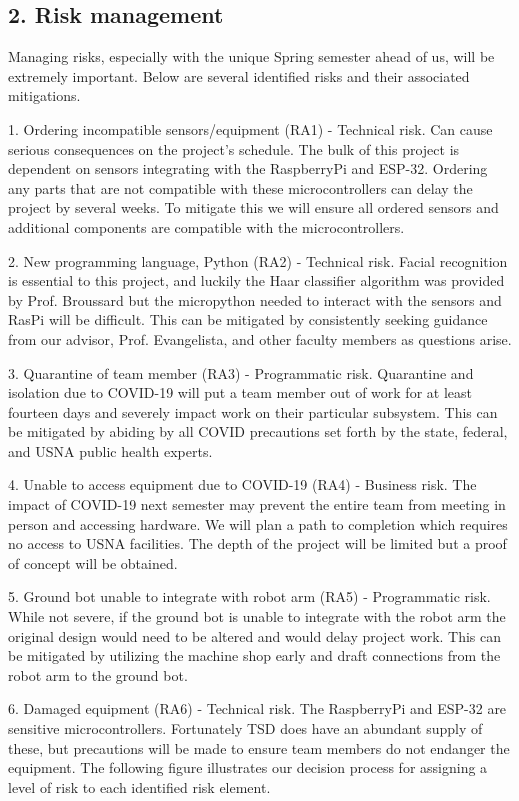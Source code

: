 ﻿\documentclass[10pt]{article}
\begin{document}
\subsection{2. Risk management}
Managing risks, especially with the unique Spring semester ahead of us, will be extremely important. Below are several identified risks and their associated mitigations.

1. Ordering incompatible sensors/equipment (RA1) - Technical risk. Can cause serious consequences on the project’s schedule. The bulk of this project is dependent on sensors integrating with the RaspberryPi and ESP-32. Ordering any parts that are not compatible with these microcontrollers can delay the project by several weeks. To mitigate this we will ensure all ordered sensors and additional components are compatible with the microcontrollers.

2. New programming language, Python (RA2) - Technical risk. Facial recognition is essential to this project, and luckily the Haar classifier algorithm was provided by Prof. Broussard but the micropython needed to interact with the sensors and RasPi will be difficult. This can be mitigated by consistently seeking guidance from our advisor, Prof. Evangelista, and other faculty members as questions arise.
 
3. Quarantine of team member (RA3) - Programmatic risk. Quarantine and isolation due to COVID-19 will put a team member out of work for at least fourteen days and severely impact work on their particular subsystem. This can be mitigated by abiding by all COVID precautions set forth by the state, federal, and USNA public health experts.

4. Unable to access equipment due to COVID-19 (RA4) - Business risk. The impact of COVID-19 next semester may prevent the entire team from meeting in person and accessing hardware. We will plan a path to completion which requires no access to USNA facilities. The depth of the project will be limited but a proof of concept will be obtained.

5. Ground bot unable to integrate with robot arm (RA5) - Programmatic risk. While not severe, if the ground bot is unable to integrate with the robot arm the original design would need to be altered and would delay project work. This can be mitigated by utilizing the machine shop early and draft connections from the robot arm to the ground bot.

6. Damaged equipment (RA6) - Technical risk. The RaspberryPi and ESP-32 are sensitive microcontrollers. Fortunately TSD does have an abundant supply of these, but precautions will be made to ensure team members do not endanger the equipment. 
        The following figure illustrates our decision process for assigning a level of risk to each identified risk element. 
  
\end{document}
